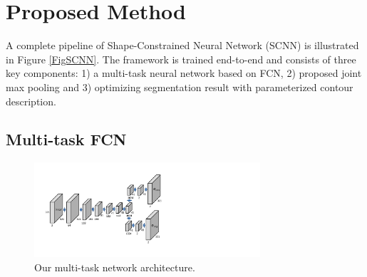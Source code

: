 \section{Proposed Method}
\label{sec:method}



A complete pipeline of Shape-Constrained Neural Network (SCNN) is illustrated in Figure \ref{FigSCNN}.
The framework is trained end-to-end and consists of three key components:
1) a multi-task neural network based on FCN,
2) proposed joint max pooling and
3) optimizing segmentation result with parameterized contour description.
%



\subsection{Multi-task FCN}
\label{sec:multi-task-fcn}

\begin{figure}\label{FigMTN}
	\begin{center}
		\includegraphics[width=3.3in]{figures/FigMTN.pdf}
	\end{center}
	\caption{Our multi-task network architecture. }
\end{figure}


